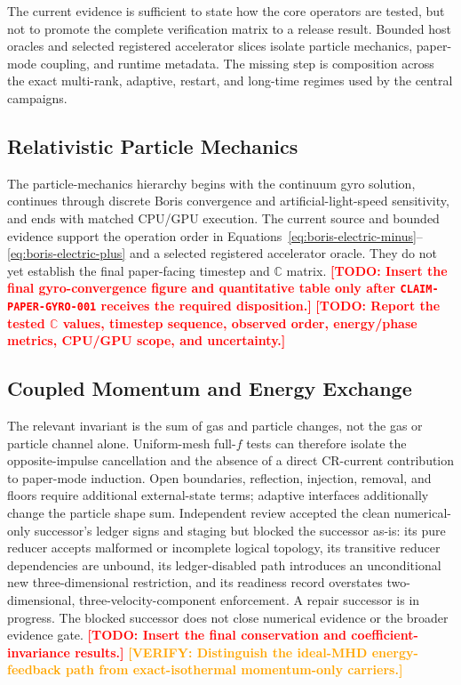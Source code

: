 \documentclass[twocolumn]{aastex701}
\newcommand{\TODO}[1]{\textcolor{red}{\textbf{[TODO: #1]}}}
\newcommand{\VERIFY}[1]{\textcolor{orange}{\textbf{[VERIFY: #1]}}}
\newcommand{\claimid}[1]{\texttt{#1}}
\begin{document}
The current evidence is sufficient to state how the core operators are tested,
but not to promote the complete verification matrix to a release result.
Bounded host oracles and selected registered accelerator slices isolate
particle mechanics, paper-mode coupling, and runtime metadata. The missing
step is composition across the exact multi-rank, adaptive, restart, and
long-time regimes used by the central campaigns.

\subsection{Relativistic Particle Mechanics}

The particle-mechanics hierarchy begins with the continuum gyro solution,
continues through discrete Boris convergence and artificial-light-speed
sensitivity, and ends with matched CPU/GPU execution. The current source and
bounded evidence support the operation order in
Equations~\ref{eq:boris-electric-minus}--\ref{eq:boris-electric-plus} and a
selected registered accelerator oracle. They do not yet establish the final
paper-facing timestep and $\mathbb{C}$ matrix.
\TODO{Insert the final gyro-convergence figure and quantitative table only after
\claimid{CLAIM-PAPER-GYRO-001} receives the required disposition.}
\TODO{Report the tested $\mathbb{C}$ values, timestep sequence, observed order,
energy/phase metrics, CPU/GPU scope, and uncertainty.}

\subsection{Coupled Momentum and Energy Exchange}

The relevant invariant is the sum of gas and particle changes, not the gas or
particle channel alone. Uniform-mesh full-$f$ tests can therefore isolate the
opposite-impulse cancellation and the absence of a direct CR-current
contribution to paper-mode induction. Open boundaries, reflection, injection,
removal, and floors require additional external-state terms; adaptive
interfaces additionally change the particle shape sum. Independent review
accepted the clean numerical-only successor's ledger signs and staging but
blocked the successor as-is: its pure reducer accepts malformed or incomplete
logical topology, its transitive reducer dependencies are unbound, its
ledger-disabled path introduces an unconditional new three-dimensional
restriction, and its readiness record overstates two-dimensional,
three-velocity-component enforcement. A repair successor is in progress.
The blocked successor does not close numerical evidence or the broader
evidence gate.
\TODO{Insert the final conservation and coefficient-invariance results.}
\VERIFY{Distinguish the ideal-MHD energy-feedback path from exact-isothermal
momentum-only carriers.}
\end{document}
